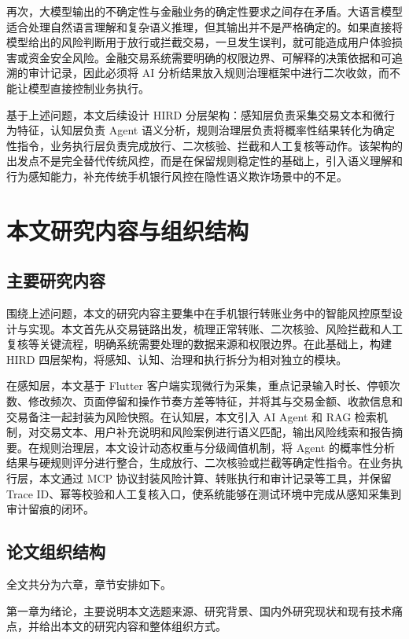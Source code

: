 \documentclass{xduugthesis}
\begin{document}
再次，大模型输出的不确定性与金融业务的确定性要求之间存在矛盾。大语言模型适合处理自然语言理解和复杂语义推理，但其输出并不是严格确定的。如果直接将模型给出的风险判断用于放行或拦截交易，一旦发生误判，就可能造成用户体验损害或资金安全风险。金融交易系统需要明确的权限边界、可解释的决策依据和可追溯的审计记录，因此必须将 AI 分析结果放入规则治理框架中进行二次收敛，而不能让模型直接控制业务执行。

基于上述问题，本文后续设计 HIRD 分层架构：感知层负责采集交易文本和微行为特征，认知层负责 Agent 语义分析，规则治理层负责将概率性结果转化为确定性指令，业务执行层负责完成放行、二次核验、拦截和人工复核等动作。该架构的出发点不是完全替代传统风控，而是在保留规则稳定性的基础上，引入语义理解和行为感知能力，补充传统手机银行风控在隐性语义欺诈场景中的不足。

\section{本文研究内容与组织结构}

\subsection{主要研究内容}

围绕上述问题，本文的研究内容主要集中在手机银行转账业务中的智能风控原型设计与实现。本文首先从交易链路出发，梳理正常转账、二次核验、风险拦截和人工复核等关键流程，明确系统需要处理的数据来源和权限边界。在此基础上，构建 HIRD 四层架构，将感知、认知、治理和执行拆分为相对独立的模块\cite{agnihotram2025agentic}。

在感知层，本文基于 Flutter 客户端实现微行为采集，重点记录输入时长、停顿次数、修改频次、页面停留和操作节奏方差等特征，并将其与交易金额、收款信息和交易备注一起封装为风险快照。在认知层，本文引入 AI Agent 和 RAG 检索机制，对交易文本、用户补充说明和风险案例进行语义匹配，输出风险线索和报告摘要。在规则治理层，本文设计动态权重与分级阈值机制，将 Agent 的概率性分析结果与硬规则评分进行整合，生成放行、二次核验或拦截等确定性指令。在业务执行层，本文通过 MCP 协议封装风险计算、转账执行和审计记录等工具，并保留 Trace ID、幂等校验和人工复核入口，使系统能够在测试环境中完成从感知采集到审计留痕的闭环。

\subsection{论文组织结构}

全文共分为六章，章节安排如下。

第一章为绪论，主要说明本文选题来源、研究背景、国内外研究现状和现有技术痛点，并给出本文的研究内容和整体组织方式。
\end{document}
